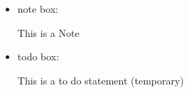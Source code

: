 \begin{itemize}
\item \begin{minipage}[t]{\textwidth} 
note box:
\begin{latexbox}
\begin{note}
This is a Note
\end{note}
\end{latexbox}
\end{minipage}


\item \begin{minipage}[t]{\textwidth} 
todo box:
\begin{latexbox}
\begin{note}
This is a to do statement (temporary)
\end{note}
\end{latexbox}
\end{minipage}

\end{itemize}